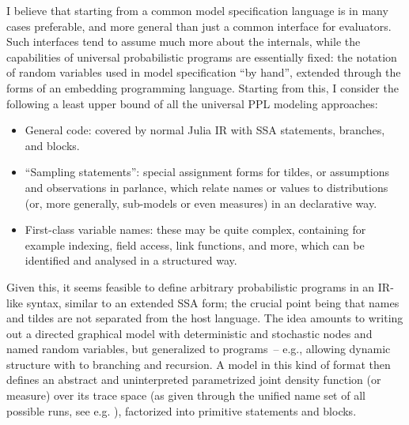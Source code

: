 I believe that starting from a common model specification language is in many cases preferable, and
more general than just a common interface for evaluators.  Such interfaces tend to assume much more
about the internals, while the capabilities of universal probabilistic programs are essentially
fixed: the notation of random variables used in model specification \enquote{by hand}, extended
through the forms of an embedding programming language.  Starting from this, I consider the
following a least upper bound of all the universal PPL modeling approaches:
\begin{itemize}
  \firmlist
\item General code: covered by normal Julia IR with SSA statements, branches, and blocks.
\item \enquote{Sampling statements}: special assignment forms for tildes, or assumptions and
  observations in \turingjl{} parlance, which relate names or values to distributions (or, more
  generally, sub-models or even measures) in an declarative way.
\item First-class variable names: these may be quite complex, containing for example indexing, field
  access, link functions, and more, which can be identified and analysed in a structured way.
\end{itemize}
Given this, it seems feasible to define arbitrary probabilistic programs in an IR-like syntax,
similar to an extended SSA form; the crucial point being that names and tildes are not separated
from the host language.  The idea amounts to writing out a directed graphical model with
deterministic and stochastic nodes and named random variables, but generalized to programs~-- e.g.,
allowing dynamic structure with to branching and recursion.  A model in this kind of format then
defines an abstract and uninterpreted parametrized joint density function (or measure) over its
trace space (as given through the unified name set of all possible runs, see
e.g. \textcite{lew2020trace}), factorized into primitive statements and blocks.

